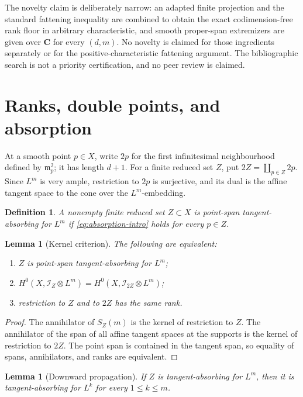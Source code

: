 \documentclass[11pt]{article}
\newtheorem{lemma}[theorem]{Lemma}
\newtheorem{definition}[theorem]{Definition}
\newcommand{\CC}{\mathbf C}
\newcommand{\cI}{\mathcal I}
\begin{document}
The novelty claim is deliberately narrow: an adapted finite projection and
the standard fattening inequality are combined to obtain the exact
codimension-free rank floor in arbitrary characteristic, and smooth
proper-span extremizers are given over $\CC$ for every $(d,m)$.  No novelty is
claimed for those ingredients separately or for the positive-characteristic
fattening argument.  The bibliographic search is not a priority certification,
and no peer review is claimed.

\section{Ranks, double points, and absorption}\label{sec:setup}

At a smooth point $p\in X$, write $2p$ for the first infinitesimal
neighbourhood defined by $\mathfrak m_p^2$; it has length $d+1$.  For a
finite reduced set $Z$, put $2Z=\coprod_{p\in Z}2p$.  Since $L^m$ is very
ample, restriction to $2p$ is surjective, and its dual is the affine tangent
space to the cone over the $L^m$-embedding.

\begin{definition}
A nonempty finite reduced set $Z\subset X$ is \emph{point-span
tangent-absorbing for $L^m$} if \eqref{eq:absorption-intro} holds for every
$p\in Z$.
\end{definition}

\begin{lemma}[Kernel criterion]\label{lem:kernel}
The following are equivalent:
\begin{enumerate}[label=(\roman*)]
\item $Z$ is point-span tangent-absorbing for $L^m$;
\item $H^0(X,\cI_Z\otimes L^m)=H^0(X,\cI_{2Z}\otimes L^m)$;
\item restriction to $Z$ and to $2Z$ has the same rank.
\end{enumerate}
\end{lemma}

\begin{proof}
The annihilator of $S_Z(m)$ is the kernel of restriction to $Z$.  The
annihilator of the span of all affine tangent spaces at the supports is the
kernel of restriction to $2Z$.  The point span is contained in the tangent
span, so equality of spans, annihilators, and ranks are equivalent.
\end{proof}

\begin{lemma}[Downward propagation]\label{lem:downward}
If $Z$ is tangent-absorbing for $L^m$, then it is tangent-absorbing for $L^k$
for every $1\leq k\leq m$.
\end{lemma}
\end{document}
